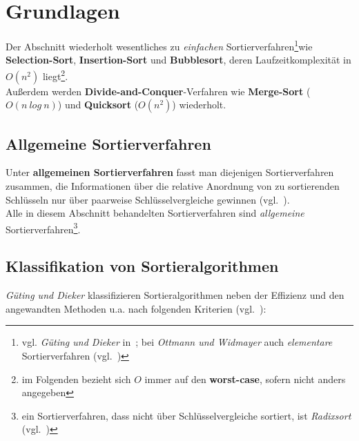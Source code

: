 \section{Grundlagen}

Der Abschnitt wiederholt wesentliches zu \textit{einfachen} Sortierverfahren\footnote{
    vgl. \textit{Güting und Dieker} in~\cite[170]{GD18e}; bei \textit{Ottmann und Widmayer} auch \textit{elementare} Sortierverfahren (vgl.~\cite[82 ff.]{OW17b})
}wie \textbf{Selection-Sort}, \textbf{Insertion-Sort} und \textbf{Bubblesort}, deren Laufzeitkomplexität in $O(n^2)$ liegt\footnote{
im Folgenden bezieht sich $O$ immer auf den \textbf{worst-case}, sofern nicht anders angegeben
}.\\
Außerdem werden \textbf{Divide-and-Conquer}-Verfahren wie \textbf{Merge-Sort} ($O(n\ log\ n)$) und \textbf{Quicksort} ($O(n^2)$) wiederholt.

\subsection{Allgemeine Sortierverfahren}
Unter \textbf{allgemeinen Sortierverfahren} fasst man diejenigen Sortierverfahren zusammen, die Informationen über die relative Anordnung von zu sortierenden Schlüsseln nur über paarweise Schlüsselvergleiche gewinnen (vgl.~\cite[130]{OW17b}).\\
Alle in diesem Abschnitt behandelten Sortierverfahren sind \textit{allgemeine} Sortierverfahren\footnote{
ein Sortierverfahren, dass nicht über Schlüsselvergleiche sortiert, ist \textit{Radixsort} (vgl.~\cite[121]{OW17b})
}.

\subsection{Klassifikation von Sortieralgorithmen}

\textit{Güting und Dieker} klassifizieren Sortieralgorithmen neben der Effizienz und den angewandten Methoden u.a. nach folgenden Kriterien (vgl.~\cite[169 f.]{GD18e}):

